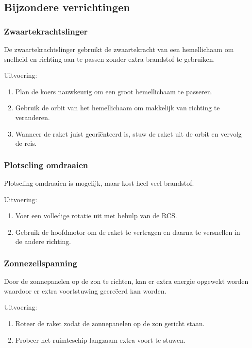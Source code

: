 \subsection{Bijzondere verrichtingen}

\subsubsection{Zwaartekrachtslinger}
De zwaartekrachtslinger gebruikt de zwaartekracht van een hemellichaam om snelheid en richting aan te passen zonder extra brandstof te gebruiken.

Uitvoering:
\begin{enumerate}
    \item Plan de koers nauwkeurig om een groot hemellichaam te passeren.
    \item Gebruik de orbit van het hemellichaam om makkelijk van richting te veranderen.
    \item Wanneer de raket juist georiënteerd is, stuw de raket uit de orbit en vervolg de reis.
\end{enumerate}

\subsubsection{Plotseling omdraaien}
Plotseling omdraaien is mogelijk, maar kost heel veel brandstof.

Uitvoering:
\begin{enumerate}
    \item Voer een volledige rotatie uit met behulp van de RCS.
    \item Gebruik de hoofdmotor om de raket te vertragen en daarna te versnellen in de andere richting.
\end{enumerate}

\subsubsection{Zonnezeilspanning}
Door de zonnepanelen op de zon te richten, kan er extra energie opgewekt worden waardoor er extra voortstuwing gecreëerd kan worden.

Uitvoering:
\begin{enumerate}
    \item Roteer de raket zodat de zonnepanelen op de zon gericht staan.
    \item Probeer het ruimteschip langzaam extra voort te stuwen.
\end{enumerate}

